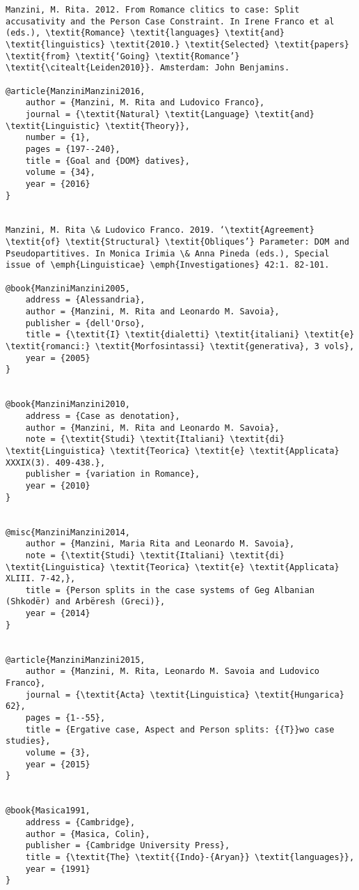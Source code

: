 \documentclass[output=paper,nonflat,modfonts]{langsci/langscibook}
\begin{document}
\begin{verbatim}
Manzini, M. Rita. 2012. From Romance clitics to case: Split accusativity and the Person Case Constraint. In Irene Franco et al (eds.), \textit{Romance} \textit{languages} \textit{and} \textit{linguistics} \textit{2010.} \textit{Selected} \textit{papers} \textit{from} \textit{‘Going} \textit{Romance’} \textit{\citealt{Leiden2010}}. Amsterdam: John Benjamins.

@article{ManziniManzini2016,
	author = {Manzini, M. Rita and Ludovico Franco},
	journal = {\textit{Natural} \textit{Language} \textit{and} \textit{Linguistic} \textit{Theory}},
	number = {1},
	pages = {197--240},
	title = {Goal and {DOM} datives},
	volume = {34},
	year = {2016}
}


Manzini, M. Rita \& Ludovico Franco. 2019. ‘\textit{Agreement} \textit{of} \textit{Structural} \textit{Obliques’} Parameter: DOM and Pseudopartitives. In Monica Irimia \& Anna Pineda (eds.), Special issue of \emph{Linguisticae} \emph{Investigationes} 42:1. 82-101.

@book{ManziniManzini2005,
	address = {Alessandria},
	author = {Manzini, M. Rita and Leonardo M. Savoia},
	publisher = {dell'Orso},
	title = {\textit{I} \textit{dialetti} \textit{italiani} \textit{e} \textit{romanci:} \textit{Morfosintassi} \textit{generativa}, 3 vols},
	year = {2005}
}


@book{ManziniManzini2010,
	address = {Case as denotation},
	author = {Manzini, M. Rita and Leonardo M. Savoia},
	note = {\textit{Studi} \textit{Italiani} \textit{di} \textit{Linguistica} \textit{Teorica} \textit{e} \textit{Applicata} XXXIX(3). 409-438.},
	publisher = {variation in Romance},
	year = {2010}
}


@misc{ManziniManzini2014,
	author = {Manzini, Maria Rita and Leonardo M. Savoia},
	note = {\textit{Studi} \textit{Italiani} \textit{di} \textit{Linguistica} \textit{Teorica} \textit{e} \textit{Applicata} XLIII. 7-42,},
	title = {Person splits in the case systems of Geg Albanian (Shkodër) and Arbëresh (Greci)},
	year = {2014}
}


@article{ManziniManzini2015,
	author = {Manzini, M. Rita, Leonardo M. Savoia and Ludovico Franco},
	journal = {\textit{Acta} \textit{Linguistica} \textit{Hungarica} 62},
	pages = {1--55},
	title = {Ergative case, Aspect and Person splits: {{T}}wo case studies},
	volume = {3},
	year = {2015}
}


@book{Masica1991,
	address = {Cambridge},
	author = {Masica, Colin},
	publisher = {Cambridge University Press},
	title = {\textit{The} \textit{{Indo}-{Aryan}} \textit{languages}},
	year = {1991}
}



\end{verbatim}
\end{document}
